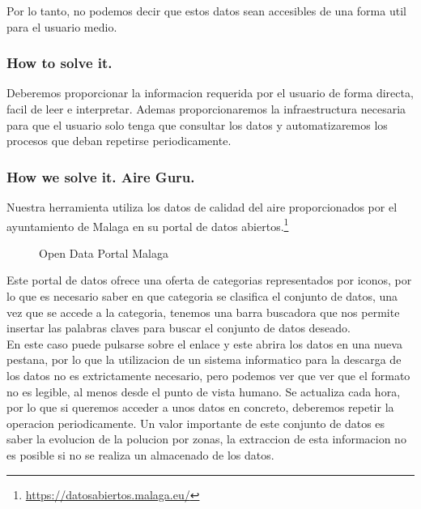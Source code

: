 Por lo tanto, no podemos decir que estos datos sean accesibles de una forma util para el usuario medio.\\
\subsubsection{How to solve it.} 

Deberemos proporcionar la informacion requerida por el usuario de forma directa, facil de leer e interpretar. Ademas proporcionaremos
la infraestructura necesaria para que el usuario solo tenga que consultar los datos y automatizaremos los procesos que deban repetirse
periodicamente.
 
\subsubsection{How we solve it. Aire Guru.} 

Nuestra herramienta utiliza los datos de calidad del aire proporcionados por el ayuntamiento de Malaga en su portal de datos abiertos.\footnote{\url{https://datosabiertos.malaga.eu/}}\\
\begin{figure}[h]
    \centering
    \hfill
    \vfill
  
  \caption{Open Data Portal Malaga}
    \end{figure}

    Este portal de datos ofrece una oferta de categorias representados por iconos, por lo que es necesario saber en que categoria se clasifica el conjunto
de datos, una vez que se accede a la categoria, tenemos una barra buscadora que nos permite insertar las palabras claves para buscar el conjunto de datos
deseado.\\

En este caso puede pulsarse sobre el enlace y este abrira los datos en una nueva pestana, por lo que la utilizacion de un sistema informatico
para la descarga de los datos no es extrictamente necesario, pero podemos ver que ver que el formato no es legible, al menos desde el punto
de vista humano. 
Se actualiza cada hora, por lo que si queremos acceder a unos datos en concreto, deberemos repetir la operacion periodicamente.
Un valor importante de este conjunto de datos es saber la evolucion de la polucion por zonas, la extraccion de esta informacion no es posible
si no se realiza un almacenado de los datos.

